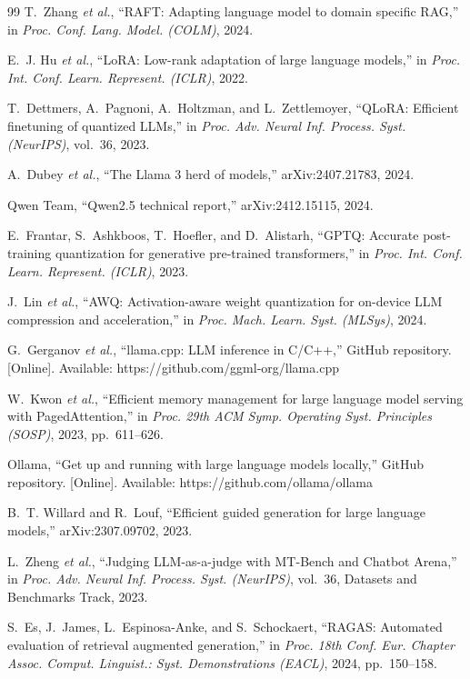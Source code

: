 \documentclass[conference]{IEEEtran}
\begin{document}
\begin{thebibliography}{99}
T.~Zhang \textit{et al.}, ``RAFT: Adapting language model to domain specific
RAG,'' in \textit{Proc. Conf. Lang. Model. (COLM)}, 2024.

E.~J. Hu \textit{et al.}, ``LoRA: Low-rank adaptation of large language
models,'' in \textit{Proc. Int. Conf. Learn. Represent. (ICLR)}, 2022.

T.~Dettmers, A.~Pagnoni, A.~Holtzman, and L.~Zettlemoyer, ``QLoRA: Efficient
finetuning of quantized LLMs,'' in \textit{Proc. Adv. Neural Inf. Process.
Syst. (NeurIPS)}, vol.~36, 2023.

A.~Dubey \textit{et al.}, ``The Llama 3 herd of models,''
arXiv:2407.21783, 2024.

Qwen Team, ``Qwen2.5 technical report,'' arXiv:2412.15115, 2024.

E.~Frantar, S.~Ashkboos, T.~Hoefler, and D.~Alistarh, ``GPTQ: Accurate
post-training quantization for generative pre-trained transformers,'' in
\textit{Proc. Int. Conf. Learn. Represent. (ICLR)}, 2023.

J.~Lin \textit{et al.}, ``AWQ: Activation-aware weight quantization for
on-device LLM compression and acceleration,'' in \textit{Proc. Mach. Learn.
Syst. (MLSys)}, 2024.

G.~Gerganov \textit{et al.}, ``llama.cpp: LLM inference in C/C++,'' GitHub
repository. [Online]. Available: https://github.com/ggml-org/llama.cpp

W.~Kwon \textit{et al.}, ``Efficient memory management for large language
model serving with PagedAttention,'' in \textit{Proc. 29th ACM Symp.
Operating Syst. Principles (SOSP)}, 2023, pp.~611--626.

Ollama, ``Get up and running with large language models locally,'' GitHub
repository. [Online]. Available: https://github.com/ollama/ollama

B.~T. Willard and R.~Louf, ``Efficient guided generation for large language
models,'' arXiv:2307.09702, 2023.

L.~Zheng \textit{et al.}, ``Judging LLM-as-a-judge with MT-Bench and Chatbot
Arena,'' in \textit{Proc. Adv. Neural Inf. Process. Syst. (NeurIPS)},
vol.~36, Datasets and Benchmarks Track, 2023.

S.~Es, J.~James, L.~Espinosa-Anke, and S.~Schockaert, ``RAGAS: Automated
evaluation of retrieval augmented generation,'' in \textit{Proc. 18th Conf.
Eur. Chapter Assoc. Comput. Linguist.: Syst. Demonstrations (EACL)}, 2024,
pp.~150--158.


\end{thebibliography}
\end{document}
